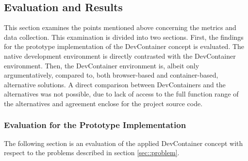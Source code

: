     \subsection{Evaluation and Results}\label{sses::eval_compare}
    This section examines the points mentioned above concerning the metrics and data collection. This examination is divided into two sections. First, the findings for the prototype implementation of the DevContainer concept is evaluated. The native development environment is directly contrasted with the DevContainer environment. Then, the DevContainer environment is, albeit only argumentatively, compared to, both browser-based and container-based, alternative solutions. A direct comparison between DevContainers and the alternatives was not possible, due to lack of access to the full function range of the alternatives and agreement enclose for the project source code.

        \subsubsection{Evaluation for the Prototype Implementation}\label{sss::eval_proto}
        The following section is an evaluation of the applied DevContainer concept with respect to the problems described in section \ref{sec::problem}.

